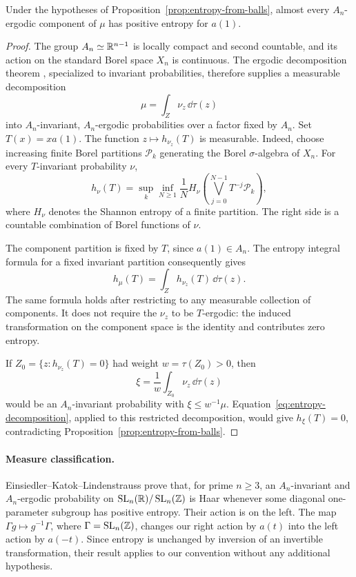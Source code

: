 \begin{lemma}\label{lem:entropy-components}
Under the hypotheses of Proposition~\ref{prop:entropy-from-balls},
almost every $A_n$-ergodic component of $\mu$ has positive entropy
for $a(1)$.
\end{lemma}

\begin{proof}
The group $A_n\simeq\mathbb R^{n-1}$ is locally compact and second countable,
and its action on the standard Borel space $X_n$ is continuous.
The ergodic decomposition theorem
\cite[Theorem~5.2]{GreschonigSchmidt2000}, specialized to invariant
probabilities, therefore supplies a measurable decomposition
\[
 \mu=\int_Z\nu_z\,\dd\tau(z)
\]
into $A_n$-invariant, $A_n$-ergodic probabilities over a factor fixed
by $A_n$. Set $T(x)=xa(1)$.
The function $z\mapsto h_{\nu_z}(T)$ is measurable.  Indeed, choose
increasing finite Borel partitions $\mathcal P_k$ generating the Borel
$\sigma$-algebra of $X_n$.  For every $T$-invariant probability $\nu$,
\[
 h_\nu(T)=\sup_k\inf_{N\ge1}\frac1N
 H_\nu\left(\bigvee_{j=0}^{N-1}T^{-j}\mathcal P_k\right),
\]
where $H_\nu$ denotes the Shannon entropy of a finite partition.
The right side is a countable combination of Borel functions of $\nu$.

The component partition is fixed by $T$, since $a(1)\in A_n$.
The entropy integral formula for a fixed invariant partition
\cite[Theorem~9.8]{Rokhlin1967} consequently gives
\begin{equation}\label{eq:entropy-decomposition}
 h_\mu(T)=\int_Z h_{\nu_z}(T)\,\dd\tau(z).
\end{equation}
The same formula holds after restricting to any measurable collection
of components.  It does not require the $\nu_z$ to be $T$-ergodic:
the induced transformation on the component space is the identity
and contributes zero entropy.

If $Z_0=\{z:h_{\nu_z}(T)=0\}$ had weight $w=\tau(Z_0)>0$, then
\[
 \xi=\frac1w\int_{Z_0}\nu_z\,\dd\tau(z)
\]
would be an $A_n$-invariant probability with $\xi\le w^{-1}\mu$.
Equation~\eqref{eq:entropy-decomposition}, applied to this restricted
decomposition, would give $h_\xi(T)=0$, contradicting
Proposition~\ref{prop:entropy-from-balls}.
\end{proof}

\paragraph{Measure classification.}
Einsiedler--Katok--Lindenstrauss
\cite[Theorem~1.3 and Corollary~1.4]{EKL2006} prove that, for prime
$n\ge3$, an $A_n$-invariant and $A_n$-ergodic probability on
$\operatorname{SL}_n(\mathbb R)/\operatorname{SL}_n(\mathbb Z)$ is Haar whenever
some diagonal one-parameter subgroup has positive entropy.
Their action is on the left.  The map
$\Gamma g\mapsto g^{-1}\Gamma$, where $\Gamma=\operatorname{SL}_n(\mathbb Z)$,
changes our right action by $a(t)$ into the left action by $a(-t)$.
Since entropy is unchanged by inversion of an invertible transformation,
their result applies to our convention without any additional hypothesis.

